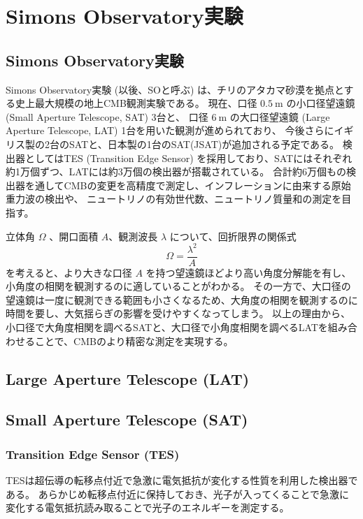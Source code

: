 \documentclass[../../main.tex]{subfiles}
\begin{document}
\chapter{Simons Observatory実験}
\section{Simons Observatory実験}
Simons Observatory実験 (以後、SOと呼ぶ) は、チリのアタカマ砂漠を拠点とする史上最大規模の地上CMB観測実験である。
現在、口径 $0.5\ \mathrm{m}$ の小口径望遠鏡 (Small Aperture Telescope, SAT) 3台と、
口径 $6\ \mathrm{m}$ の大口径望遠鏡 (Large Aperture Telescope, LAT) 1台を用いた観測が進められており\cite{so:current_status}、
今後さらにイギリス製の2台のSATと、日本製の1台のSAT(JSAT)が追加される予定である。
検出器としてはTES (Transition Edge Sensor) を採用しており、SATにはそれぞれ約1万個ずつ、LATには約3万個の検出器が搭載されている。
合計約6万個もの検出器を通してCMBの変更を高精度で測定し、インフレーションに由来する原始重力波の検出や、
ニュートリノの有効世代数、ニュートリノ質量和の測定を目指す\cite{so:science_forecast}。

立体角 $\Omega$ 、開口面積 $A$、観測波長 $\lambda$ について、回折限界の関係式
\begin{equation}
    \Omega = \dfrac{\lambda^2}{A}
\end{equation}
を考えると、より大きな口径 $A$ を持つ望遠鏡ほどより高い角度分解能を有し、小角度の相関を観測するのに適していることがわかる。
その一方で、大口径の望遠鏡は一度に観測できる範囲も小さくなるため、大角度の相関を観測するのに時間を要し、大気揺らぎの影響を受けやすくなってしまう。
以上の理由から、小口径で大角度相関を調べるSATと、大口径で小角度相関を調べるLATを組み合わせることで、CMBのより精密な測定を実現する。

\section{Large Aperture Telescope (LAT)}
\section{Small Aperture Telescope (SAT)}
\subsection{Transition Edge Sensor (TES)}
TESは超伝導の転移点付近で急激に電気抵抗が変化する性質を利用した検出器である。
あらかじめ転移点付近に保持しておき、光子が入ってくることで急激に変化する電気抵抗読み取ることで光子のエネルギーを測定する。
\end{document}
